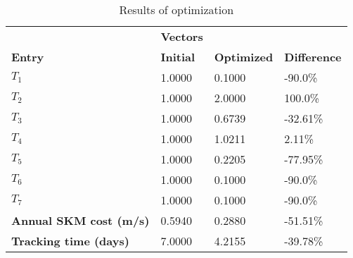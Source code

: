 \begin{table}[H]
\centering
\begin{tabular}{llll}
\textbf{}      & \cellcolor[HTML]{EFEFEF}\textbf{Vectors} & \textbf{} & \textbf{}         \\
\rowcolor[HTML]{EFEFEF} 
\textbf{Entry} & \textbf{Initial} & \textbf{Optimized} & \textbf{Difference} \\
$T_1$ & 1.0000 & 0.1000 & -90.0\% \\ 
$T_2$ & 1.0000 & 2.0000 & 100.0\% \\ 
$T_3$ & 1.0000 & 0.6739 & -32.61\% \\ 
$T_4$ & 1.0000 & 1.0211 & 2.11\% \\ 
$T_5$ & 1.0000 & 0.2205 & -77.95\% \\ 
$T_6$ & 1.0000 & 0.1000 & -90.0\% \\ 
$T_7$ & 1.0000 & 0.1000 & -90.0\% \\ 
\rowcolor[HTML]{EFEFEF} 
\textbf{Annual SKM cost (m/s)}  & 0.5940 & 0.2880 & -51.51\% \\ 
\rowcolor[HTML]{EFEFEF} 
\textbf{Tracking time (days)}  & 7.0000 & 4.2155 & -39.78\% \\ 
\end{tabular}
\caption{Results of optimization}
\label{tab:OptimizationAnalysis}
\end{table}
